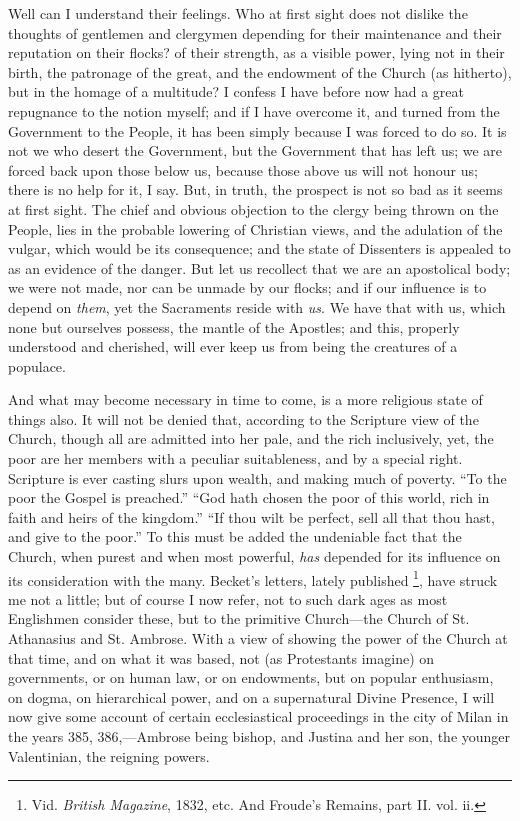 Well can I understand their feelings. Who at first sight does not
dislike the thoughts of gentlemen and clergymen depending for their
maintenance and their reputation on their flocks? of their strength,
as a visible power, lying not in their birth, the patronage of the
great, and the endowment of the Church (as hitherto), but in the
homage of a multitude? I confess I have before now had a great
repugnance to the notion myself; and if I have overcome it, and turned
from the Government to the People, it has been simply because I was
forced to do so. It is not we who desert the Government, but the
Government that has left us; we are forced back upon those below us,
because those above us will not honour us; there is no help for it, I
say. But, in truth, the prospect is not so bad as it seems at first
sight. The chief and obvious objection to the clergy being thrown on
the People, lies in the probable lowering of Christian views, and the
adulation of the vulgar, which would be its consequence; and the state
of Dissenters is appealed to as an evidence of the danger. But let us
recollect that we are an apostolical body; we were not made, nor can
be unmade by our flocks; and if our influence is to depend on \emph{them},
yet the Sacraments reside with \emph{us}. We have that with us, which
none but ourselves possess, the mantle of the Apostles; and this,
properly understood and cherished, will ever keep us from being the
creatures of a populace.

And what may become necessary in time to come, is a more religious
state of things also. It will not be denied that, according to the
Scripture view of the Church, though all are admitted into her pale,
and the rich inclusively, yet, the poor are her members with a
peculiar suitableness, and by a special right. Scripture is ever
casting slurs upon wealth, and making much of poverty. ``To
the poor the Gospel is preached.'' ``God hath chosen the poor
of this world, rich in faith and heirs of the kingdom.'' ``If
thou wilt be perfect, sell all that thou hast, and give to the
poor.'' To this must be added the undeniable fact that the Church,
when purest and when most powerful, \emph{has} depended for its
influence on its consideration with the many. Becket's letters, lately
published \footnote{Vid. \emph{British Magazine}, 1832, etc. And Froude's Remains,
part II. vol. ii.}, have struck me
not a little; but of course I now refer, not to such dark ages as most
Englishmen consider these, but to the primitive Church—the Church of
St. Athanasius and St. Ambrose. With a view of showing the power of
the Church at that time, and on what it was based, not (as Protestants
imagine) on governments, or on human law, or on endowments, but on
popular enthusiasm, on dogma, on hierarchical power, and on a
supernatural Divine Presence, I will now give some account of certain
ecclesiastical proceedings in the city of Milan in the years 385, 386,—Ambrose
being bishop, and Justina and her son, the younger Valentinian, the
reigning powers.

